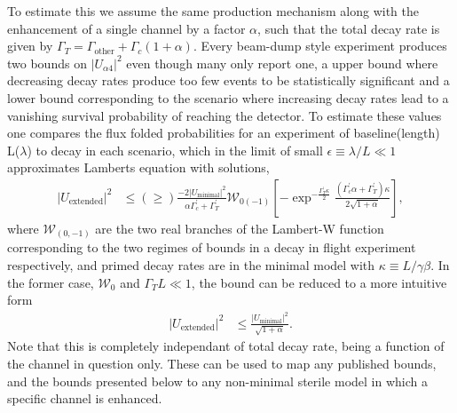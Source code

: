 \documentclass[11pt, a4paper]{article}
\begin{document}
To estimate this we assume the same production mechanism along with the enhancement of a single channel by a
factor $\alpha$, such that the total decay rate is given by $\Gamma_T =
\Gamma_\text{other}+\Gamma_c (1+\alpha)$. Every beam-dump style experiment produces two bounds on $|U_{\alpha 4}|^2$ even though many only report one, a
upper bound where decreasing decay rates produce too few events to be
statistically significant and a lower bound corresponding to the scenario where
increasing decay rates lead to a vanishing survival probability of reaching the
detector. To estimate these values one compares the flux folded probabilities
for an experiment of baseline(length) L($\lambda$) to decay in each scenario,
which in the limit of small $\epsilon \equiv \lambda/L \ll 1$ approximates
Lamberts equation with solutions, \begin{align*} |U_\text{extended}|^2 &\leq (\geq)
\frac{-2 |U_\text{minimal}|^2}{\alpha \Gamma^\prime_c +\Gamma^\prime_T}
\mathcal{W}_{0(-1)}\left[-\exp^{-\frac{\Gamma^\prime_T \kappa}{2}}
\frac{(\Gamma^\prime_c \alpha + \Gamma^\prime_T)\kappa}{2\sqrt{1+\alpha}}
\right], \end{align*} where $\mathcal{W}_{(0,-1)}$ are the two real branches of
the Lambert-W function corresponding to the two regimes of bounds in a decay in
flight experiment respectively, and primed decay rates are in the minimal model
with $\kappa \equiv L/\gamma \beta$. In the former case, $\mathcal{W}_0$ and
$\Gamma_T L \ll 1$, the bound can be reduced to a more intuitive form
\begin{align*} |U_\text{extended}|^2 &\leq
\frac{|U_{\text{minimal}}|^2}{\sqrt{1+\alpha}}.  \end{align*} Note that this is completely independant of total decay rate, being a function of the channel in question only.  
These can be used to map any published bounds, and the bounds presented below to any non-minimal sterile model in which a specific channel is enhanced.\\
\end{document}
